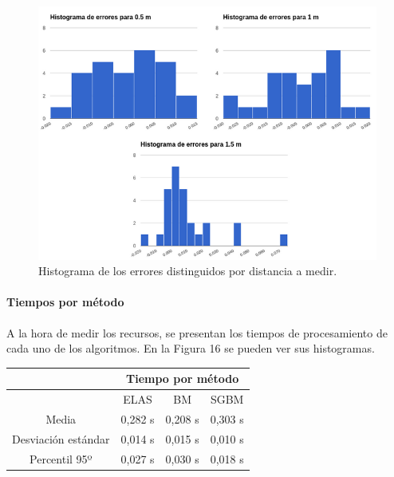 \documentclass[11pt,a4paper,titlepage]{article}
\newcommand{\Figure}[1]{Figura #1}
\begin{document}
\begin{figure}[h!]

  \centering
    \includegraphics[width=1\textwidth]{f14.png}
  \caption{Histograma de los errores distinguidos por distancia a medir.}
\end{figure}

\paragraph{Tiempos por método}
\hfill \break

A la hora de medir los recursos, se presentan los tiempos de procesamiento de cada uno de los algoritmos. En la \Figure{16} se pueden ver sus histogramas.

\begin{table}[!ht]
\centering
\begin{tabular}{@{}clll@{}}
& \multicolumn{3}{c}{Tiempo por método} \\ \midrule
       & \multicolumn{1}{c}{ELAS} & \multicolumn{1}{c}{BM} & \multicolumn{1}{c}{SGBM} \\ \midrule
Media & 0,282 s & 0,208 s & 0,303 s \\ \midrule
Desviación estándar & 0,014 s & 0,015 s & 0,010 s \\ \midrule
Percentil 95º & 0,027 s & 0,030 s & 0,018 s \\ \midrule
\end{tabular}
\end{table}
\end{document}
